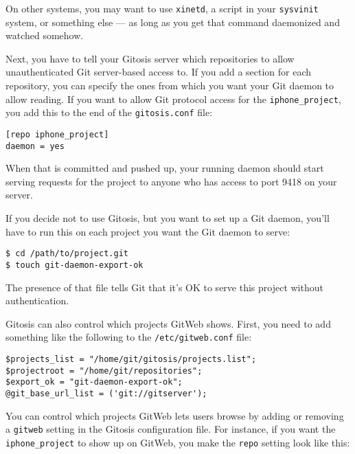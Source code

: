 \documentclass[a4paper]{book}
\begin{document}
On other systems, you may want to use \texttt{xinetd}, a script in your \texttt{sysvinit} system, or something else --- as long as you get that command daemonized and watched somehow.

Next, you have to tell your Gitosis server which repositories to allow unauthenticated Git server-based access to. If you add a section for each repository, you can specify the ones from which you want your Git daemon to allow reading. If you want to allow Git protocol access for the \texttt{iphone\_project}, you add this to the end of the \texttt{gitosis.conf} file:

\begin{shaded}\begin{verbatim}
[repo iphone_project]
daemon = yes
\end{verbatim}\end{shaded}

When that is committed and pushed up, your running daemon should start serving requests for the project to anyone who has access to port 9418 on your server.

If you decide not to use Gitosis, but you want to set up a Git daemon, you'll have to run this on each project you want the Git daemon to serve:

\begin{shaded}\begin{verbatim}
$ cd /path/to/project.git
$ touch git-daemon-export-ok
\end{verbatim}\end{shaded}

The presence of that file tells Git that it's OK to serve this project without authentication.

Gitosis can also control which projects GitWeb shows. First, you need to add something like the following to the \texttt{/etc/gitweb.conf} file:

\begin{shaded}\begin{verbatim}
$projects_list = "/home/git/gitosis/projects.list";
$projectroot = "/home/git/repositories";
$export_ok = "git-daemon-export-ok";
@git_base_url_list = ('git://gitserver');
\end{verbatim}\end{shaded}

You can control which projects GitWeb lets users browse by adding or removing a \texttt{gitweb} setting in the Gitosis configuration file. For instance, if you want the \texttt{iphone\_project} to show up on GitWeb, you make the \texttt{repo} setting look like this:
\end{document}

